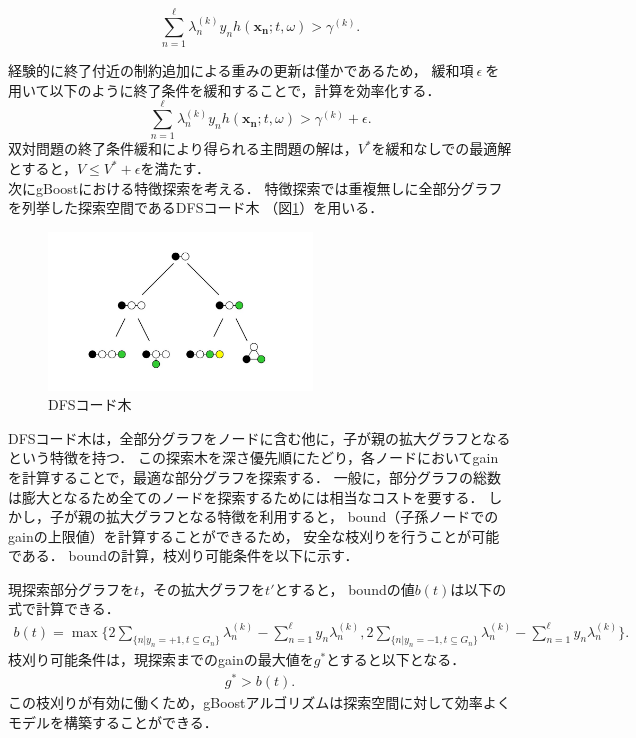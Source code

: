\begin{equation*}
	\sum_{n=1}^{\ell} \lambda_{n}^{(k)} y_{n} h(\bm{x_{n}} ; t, \omega) > \gamma^{(k)}.
\end{equation*}

経験的に終了付近の制約追加による重みの更新は僅かであるため，
緩和項$\ \epsilon \ $を用いて以下のように終了条件を緩和することで，計算を効率化する．
\begin{equation*}
	\sum_{n=1}^{\ell} \lambda_{n}^{(k)} y_{n} h(\bm{x_{n}} ; t, \omega) > \gamma^{(k)} + \epsilon .
\end{equation*}
双対問題の終了条件緩和により得られる主問題の解は，$V^*$を緩和なしでの最適解とすると，$V \leq V^* + \epsilon$を満たす．\\

次にgBoostにおける特徴探索を考える．
特徴探索では重複無しに全部分グラフを列挙した探索空間であるDFSコード木\cite{gSpan} （図\ref{small_DFS}）を用いる．
\begin{figure}[t]
	\centering
	\includegraphics[width=70mm]{figure/small_DFS.jpg}
	\caption{DFSコード木}
	\label{small_DFS}
\end{figure}
DFSコード木は，全部分グラフをノードに含む他に，子が親の拡大グラフとなるという特徴を持つ．
この探索木を深さ優先順にたどり，各ノードにおいてgainを計算することで，最適な部分グラフを探索する．
一般に，部分グラフの総数は膨大となるため全てのノードを探索するためには相当なコストを要する．
しかし，子が親の拡大グラフとなる特徴を利用すると，
bound（子孫ノードでのgainの上限値）を計算することができるため，
安全な枝刈りを行うことが可能である．
boundの計算，枝刈り可能条件を以下に示す．

現探索部分グラフを$t$，その拡大グラフを$t'$とすると，
boundの値$b(t)$は以下の式で計算できる．
\begin{align}
	\label{eq:bound}
	b(t) = \max\{2 \sum_{\{n|y_{n}=+1, t \subseteq G_{n}\}} \lambda_{n}^{(k)} - \sum_{n=1}^{\ell} y_{n} \lambda_{n}^{(k)},	2 \sum_{\{n|y_{n}=-1, t \subseteq G_{n}\}} \lambda_{n}^{(k)} - \sum_{n=1}^{\ell} y_{n} \lambda_{n}^{(k)}\}.
\end{align}
枝刈り可能条件は，現探索までのgainの最大値を$g^{*}$とすると以下となる．
\begin{align}
	\label{eq:prune}
	g^{*} > b(t).
\end{align}
この枝刈りが有効に働くため，gBoostアルゴリズムは探索空間に対して効率よくモデルを構築することができる．
